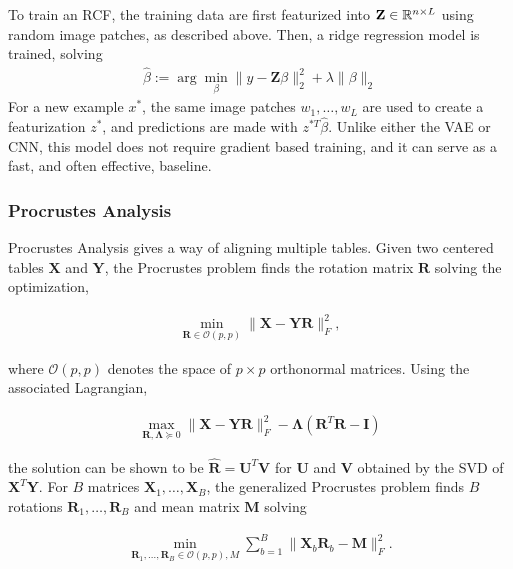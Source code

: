 To train an RCF, the training data are first featurized into $\mathbf{Z} \in
\mathbb{R}^{n \times L}$ using random image patches, as described above. Then, a
ridge regression model is trained, solving
\begin{align*}
\hat{\beta} := \arg \min_{\beta} \|y - \mathbf{Z}\beta\|_{2}^{2} + \lambda \|\beta\|_{2}
\end{align*}
For a new example $x^{\ast}$, the same image patches $w_{1}, \dots, w_{L}$ are
used to create a featurization $z^{\ast}$, and predictions are made with
$z^{\ast T}\hat{\beta}$. Unlike either the VAE or CNN, this model does not
require gradient based training, and it can serve as a fast, and often
effective, baseline.

\subsubsection{Procrustes Analysis}
Procrustes Analysis gives a way of aligning multiple tables. Given two centered
tables $\mathbf{X}$ and $\mathbf{Y}$, the Procrustes problem finds the rotation
matrix $\mathbf{R}$ solving the optimization,

\begin{align*}
\min_{\mathbf{R} \in \mathcal{O}\left(p, p\right)} \|\mathbf{X} - \mathbf{Y}\mathbf{R}\|^{2}_{F},
\end{align*}

where $\mathcal{O}\left(p, p\right)$ denotes the space of $p\times p$
orthonormal matrices. Using the associated Lagrangian,

\begin{align*}
\max_{\mathbf{R}, \mathbf{\Lambda} \succeq 0} \|\mathbf{X} - \mathbf{Y}\mathbf{R}\|_{F}^{2} - \mathbf{\Lambda}\left(\mathbf{R}^{T}\mathbf{R} - \mathbf{I}\right)
\end{align*}

the solution can be shown to be $\hat{\mathbf{R}} = \mathbf{U}^{T}\mathbf{V}$
for $\mathbf{U}$ and $\mathbf{V}$ obtained by the SVD of
$\mathbf{X}^{T}\mathbf{Y}$. For $B$ matrices $\mathbf{X}_{1}, \dots,
\mathbf{X}_{B}$, the generalized Procrustes problem finds $B$ rotations
$\mathbf{R}_{1}, \dots, \mathbf{R}_{B}$ and mean matrix $\mathbf{M}$ solving

\begin{align*}
\min_{\mathbf{R}_{1}, \dots, \mathbf{R}_{B} \in \mathcal{O}\left(p, p\right), M} \sum_{b = 1}^{B} \|\mathbf{X}_{b}\mathbf{R}_{b} - \mathbf{M}\|_{F}^{2}.
\end{align*}

